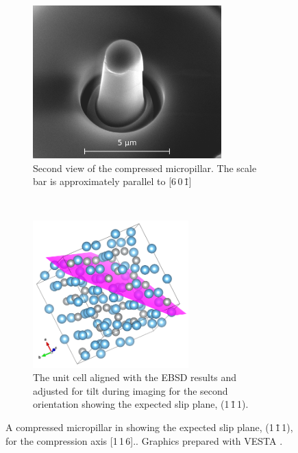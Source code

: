 \begin{figure}
\begin{subfigure}{0.45\textwidth}
\includegraphics[width=0.8\textwidth]{pillar_3_v2}
\caption{Second view of the compressed  micropillar. The scale bar is approximately parallel to [6\,0\,\={1}]}
\end{subfigure}
~
\begin{subfigure}{0.45\textwidth}
\centering
\includegraphics[width=0.66\textwidth]{Pillar_3_unit_cell_v2}
\caption{The unit cell aligned with the EBSD results and adjusted for tilt during imaging for the second orientation showing the expected slip plane, (1\,\={1}\,1).}
\end{subfigure}
\caption[A compressed micropillar of  showing the slip plane.]{A compressed micropillar in  showing the expected slip plane, (1\,\={1}\,1), for the compression axis [1\,1\,6].\label{fig:micropillar}. Graphics prepared with VESTA \cite{Momma2011}.}
\end{figure}




